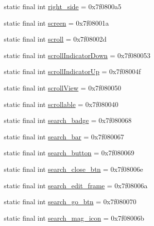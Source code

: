 \begin{CompactItemize}
\item 
static final int \hyperlink{classandroid_1_1support_1_1mediacompat_1_1_r_1_1id_33df8552b2873dc16c67af84010351c8}{right\_\-side} = 0x7f0800a5
\item 
static final int \hyperlink{classandroid_1_1support_1_1mediacompat_1_1_r_1_1id_2c6ede7dd41d6afae5fc6cb48044b739}{screen} = 0x7f08001a
\item 
static final int \hyperlink{classandroid_1_1support_1_1mediacompat_1_1_r_1_1id_2aaa6d1924ec43b6f5dc0e61fc0579ae}{scroll} = 0x7f08002d
\item 
static final int \hyperlink{classandroid_1_1support_1_1mediacompat_1_1_r_1_1id_0d25b4319060c6f8bc9b125437fc1418}{scrollIndicatorDown} = 0x7f080053
\item 
static final int \hyperlink{classandroid_1_1support_1_1mediacompat_1_1_r_1_1id_5dab84c90572bd487dec609300adfbfd}{scrollIndicatorUp} = 0x7f08004f
\item 
static final int \hyperlink{classandroid_1_1support_1_1mediacompat_1_1_r_1_1id_3729930d06fe1a8838692a5f71860a38}{scrollView} = 0x7f080050
\item 
static final int \hyperlink{classandroid_1_1support_1_1mediacompat_1_1_r_1_1id_04f68780ca650e512ed2f7486abb00cd}{scrollable} = 0x7f080040
\item 
static final int \hyperlink{classandroid_1_1support_1_1mediacompat_1_1_r_1_1id_c121d7e78dc0f78764d9284a4a7885af}{search\_\-badge} = 0x7f080068
\item 
static final int \hyperlink{classandroid_1_1support_1_1mediacompat_1_1_r_1_1id_4fa978c4eaf0bfea6b82e7c5321fac56}{search\_\-bar} = 0x7f080067
\item 
static final int \hyperlink{classandroid_1_1support_1_1mediacompat_1_1_r_1_1id_238df7ec871716aef657d48e00c7a323}{search\_\-button} = 0x7f080069
\item 
static final int \hyperlink{classandroid_1_1support_1_1mediacompat_1_1_r_1_1id_a5337d318cbb15a70197809e63e7df25}{search\_\-close\_\-btn} = 0x7f08006e
\item 
static final int \hyperlink{classandroid_1_1support_1_1mediacompat_1_1_r_1_1id_49b24c53b2c835b5cdc1a4ee7d724e24}{search\_\-edit\_\-frame} = 0x7f08006a
\item 
static final int \hyperlink{classandroid_1_1support_1_1mediacompat_1_1_r_1_1id_e24604ab322d9a129c0ddf40780a182a}{search\_\-go\_\-btn} = 0x7f080070
\item 
static final int \hyperlink{classandroid_1_1support_1_1mediacompat_1_1_r_1_1id_14960c8449a43c2ca1224ed574b1a72f}{search\_\-mag\_\-icon} = 0x7f08006b

\end{CompactItemize}
